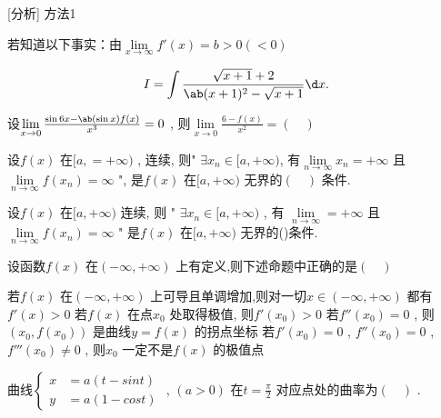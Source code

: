 \begin{solution}{}
    [分析] 方法1

    若知道以下事实：由$ \lim\limits_{x \to \infty} f'(x) = b > 0 ( < 0 )  $ 
\end{solution}
\begin{question}
    \begin{equation*}
        I = \int \frac{ \sqrt{x + 1} + 2 }{\ab(x + 1)^2 - \sqrt{x + 1}} \d x.
    \end{equation*}
\end{question}
\begin{question}
    设$ \lim\limits_{x \to 0} \frac{ \sin 6x - \ab(\sin x) f(x) }{ x^3 } = 0 $ , 则$ \lim\limits_{x \to 0} \frac{6 - f(x)}{x^2} = (\quad) $ 
\end{question}
\begin{question}
    设$ f(x) $ 在$ [a, = +\infty) $ , 连续, 则" $ \exists x_n \in [a, +\infty) $, 有$ \lim\limits_{n \to \infty} x_n = +\infty $ 且$ \lim\limits_{n \to \infty} f(x_n) = \infty $ ", 是$ f(x) $ 在$ [a, +\infty) $ 无界的$ (\quad) $ 条件.
\end{question}
\begin{question}
    设$ f(x) $ 在$ [a, +\infty) $ 连续, 则 " $ \exists x_n \in[a, +\infty) $ , 有 $ \lim\limits_{n \to \infty} = +\infty $ 且$ \lim\limits_{n \to \infty} f(x_n) = \infty $ " 是$ f(x) $ 在$ [a, +\infty) $ 无界的(\quad)条件.
\end{question}
\begin{question}
    设函数$ f(x) $ 在$ (-\infty, +\infty) $ 上有定义,则下述命题中正确的是$ (\quad) $ 
    \begin{tasks}
        \task   若$ f(x) $ 在$ (-\infty, +\infty) $ 上可导且单调增加,则对一切$ x \in (-\infty, +\infty) $ 都有$ f'(x) > 0 $ 
        \task   若$ f(x) $ 在点$ x_0 $ 处取得极值, 则$ f'(x_0) > 0 $ 
        \task   若$ f''(x_0) = 0 $ , 则$ (x_0, f(x_0)) $ 是曲线$ y = f(x) $ 的拐点坐标
        \task   若$ f'(x_0) = 0 $ , $ f''(x_0) = 0 $ , $ f'''(x_0) \neq 0 $ , 则$ x_0 $ 一定不是$ f(x) $ 的极值点
    \end{tasks}
\end{question}
\begin{question}
    曲线$ 
    \begin{cases}
        x &= a(t - sint)    \\
        y &= a(1 - cost)
    \end{cases}
     $ , $ (a > 0) $ 在$ t = \frac{\pi}{2} $ 对应点处的曲率为$ (\quad) $ .
\end{question}
